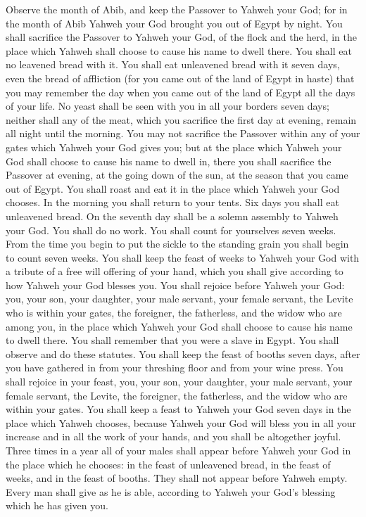  Observe the month of Abib, and keep the Passover to
Yahweh your God; for in the month of Abib Yahweh your God brought you
out of Egypt by night.  You shall sacrifice the Passover
to Yahweh your God, of the flock and the herd, in the place which Yahweh
shall choose to cause his name to dwell there.  You shall
eat no leavened bread with it. You shall eat unleavened bread with it
seven days, even the bread of affliction (for you came out of the land
of Egypt in haste) that you may remember the day when you came out of
the land of Egypt all the days of your life.  No yeast
shall be seen with you in all your borders seven days; neither shall any
of the meat, which you sacrifice the first day at evening, remain all
night until the morning.  You may not sacrifice the
Passover within any of your gates which Yahweh your God gives you;
 but at the place which Yahweh your God shall choose to
cause his name to dwell in, there you shall sacrifice the Passover at
evening, at the going down of the sun, at the season that you came out
of Egypt.  You shall roast and eat it in the place which
Yahweh your God chooses. In the morning you shall return to your tents.
 Six days you shall eat unleavened bread. On the seventh
day shall be a solemn assembly to Yahweh your God. You shall do no work.
 You shall count for yourselves seven weeks. From the time
you begin to put the sickle to the standing grain you shall begin to
count seven weeks.  You shall keep the feast of weeks to
Yahweh your God with a tribute of a free will offering of your hand,
which you shall give according to how Yahweh your God blesses you.
 You shall rejoice before Yahweh your God: you, your son,
your daughter, your male servant, your female servant, the Levite who is
within your gates, the foreigner, the fatherless, and the widow who are
among you, in the place which Yahweh your God shall choose to cause his
name to dwell there.  You shall remember that you were a
slave in Egypt. You shall observe and do these statutes. 
You shall keep the feast of booths seven days, after you have gathered
in from your threshing floor and from your wine press. 
You shall rejoice in your feast, you, your son, your daughter, your male
servant, your female servant, the Levite, the foreigner, the fatherless,
and the widow who are within your gates.  You shall keep
a feast to Yahweh your God seven days in the place which Yahweh chooses,
because Yahweh your God will bless you in all your increase and in all
the work of your hands, and you shall be altogether joyful.
 Three times in a year all of your males shall appear
before Yahweh your God in the place which he chooses: in the feast of
unleavened bread, in the feast of weeks, and in the feast of booths.
They shall not appear before Yahweh empty.  Every man
shall give as he is able, according to Yahweh your God's blessing which
he has given you.

